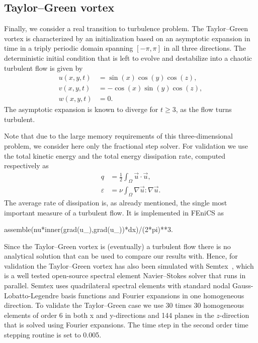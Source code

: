 \subsection{Taylor--Green vortex}
\label{sec:mortensen:TG}
Finally, we consider a real transition to turbulence problem. The
Taylor--Green vortex is characterized by an initialization based on
an asymptotic expansion in time in a triply periodic domain spanning
$[-\pi,\pi]$ in all three directions. The deterministic initial condition
that is left to evolve and destabilize into a chaotic turbulent flow is
given by
\begin{align}
 u(x,y,t)&=\sin(x)\cos(y)\cos(z),
\\
 v(x,y,t)&=-\cos(x)\sin(y)\cos(z),
\\
 w(x,y,t)&=0.
\end{align}
The asymptotic expansion is known to diverge for $t \ge 3$, as the flow
turns turbulent.

Note that due to the large memory requirements of this three-dimensional
problem, we consider here only the fractional step solver. For validation
we use the total kinetic energy and the total energy dissipation rate,
computed respectively as
\begin{align}
 q &= \frac{1}{2} \int_{\Omega} \vec{u} \cdot \vec{u}, \label{eq:mortensen:q}
\\
 \varepsilon &= \nu \int_{\Omega} \nabla \vec{u}: \nabla \vec{u}. \label{eq:mortensen:diss}
\end{align}
The average rate of dissipation is, as already mentioned, the single
most important measure of a turbulent flow. It is implemented in FEniCS as
\begin{python}
assemble(nu*inner(grad(u_),grad(u_))*dx)/(2*pi)**3.
\end{python}

Since the Taylor--Green vortex is (eventually) a turbulent flow
there is no analytical solution that can be used to compare our
results with. Hence, for validation the Taylor--Green vortex has also
been simulated with Semtex~\citep{Blackburn2009}, which is a well
tested open-source spectral element Navier--Stokes solver that runs
in parallel. Semtex uses quadrilateral spectral elements with standard
nodal Gauss-Lobatto-Legendre basis functions and Fourier expansions in one
homogeneous direction. To validate the Taylor--Green case we use 30 times
30 homogeneous elements of order 6 in both x and y-directions and 144
planes in the $z$-direction that is solved using Fourier expansions. The
time step in the second order time stepping routine is set to 0.005.

